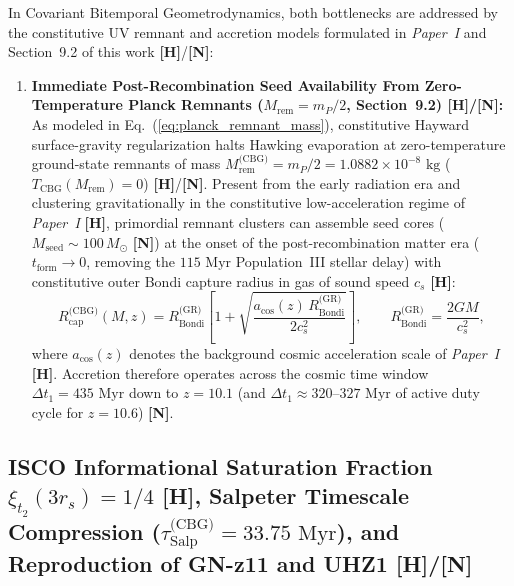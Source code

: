 \documentclass[11pt,a4paper]{article}
\newcommand{\catH}{\textbf{\textcolor{orange!85!black}{[H]}}}
\newcommand{\catN}{\textbf{\textcolor{teal!75!black}{[N]}}}
\theoremstyle{plain}
\theoremstyle{definition}
\theoremstyle{remark}
\numberwithin{equation}{section}
\begin{document}
In Covariant Bitemporal Geometrodynamics, both bottlenecks are addressed by the constitutive UV remnant and accretion models formulated in \textit{Paper~I} \cite{jimenez2026a} and Section~9.2 of this work \catH/\catN:
\begin{enumerate}
  \item \textbf{Immediate Post-Recombination Seed Availability From Zero-Temperature Planck Remnants ($M_{\text{rem}} = m_P/2$, Section~9.2) \catH/\catN:} As modeled in Eq.~(\ref{eq:planck_remnant_mass}), constitutive Hayward surface-gravity regularization halts Hawking evaporation at zero-temperature ground-state remnants of mass $M_{\text{rem}}^{\text{(CBG)}} = m_P / 2 = 1.0882 \times 10^{-8}\text{ kg}$ ($T_{\text{CBG}}(M_{\text{rem}}) = 0$) \catH/\catN. Present from the early radiation era and clustering gravitationally in the constitutive low-acceleration regime of \textit{Paper~I} \cite{jimenez2026a} \catH, primordial remnant clusters can assemble seed cores ($M_{\text{seed}} \sim 100\,M_\odot$ \catN) at the onset of the post-recombination matter era ($t_{\text{form}} \to 0$, removing the $115\text{ Myr}$ Population~III stellar delay) with constitutive outer Bondi capture radius in gas of sound speed $c_s$ \catH:
  \begin{equation}
  R_{\text{cap}}^{\text{(CBG)}}(M, z) = R_{\text{Bondi}}^{\text{(GR)}} \left[ 1 + \sqrt{\frac{a_{\text{cos}}(z)\,R_{\text{Bondi}}^{\text{(GR)}}}{2 c_s^2}} \right], \qquad R_{\text{Bondi}}^{\text{(GR)}} = \frac{2GM}{c_s^2},
  \label{eq:cbg_bondi_capture_radius}
  \end{equation}
  where $a_{\text{cos}}(z)$ denotes the background cosmic acceleration scale of \textit{Paper~I} \cite{jimenez2026a} \catH. Accretion therefore operates across the cosmic time window $\Delta t_1 = 435\text{ Myr}$ down to $z = 10.1$ (and $\Delta t_1 \approx 320\text{--}327\text{ Myr}$ of active duty cycle for $z = 10.6$) \catN.
\end{enumerate}

\subsection{\texorpdfstring{ISCO Informational Saturation Fraction $\xi_{t_2}(3r_s) = 1/4$ \catH, Salpeter Timescale Compression ($\tau_{\text{Salp}}^{\text{(CBG)}} = 33.75\text{ Myr}$), and Reproduction of GN-z11 and UHZ1 \catH/\catN}{ISCO Informational Saturation Fraction, Salpeter Timescale Compression, and Reproduction of GN-z11 and UHZ1}}
\end{document}
